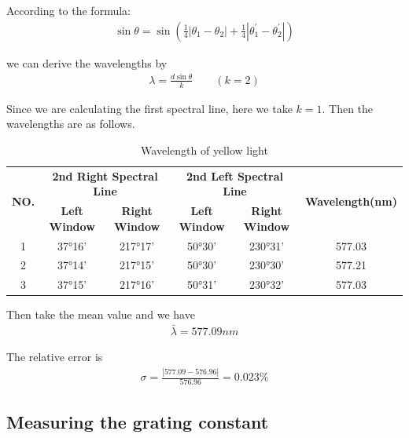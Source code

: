 \documentclass[UTF8]{article}
\begin{document}
   	 	According to the formula:
   	 	\begin{eqnarray}
   	 	\sin \theta = \sin (\frac{1}{4}\left | \theta_1 - \theta_2 \right | + \frac{1}{4}\left | \theta_1^{'} - \theta_2^{'} \right |)
   	 	\end{eqnarray}
   	 	
   	 	we can derive the wavelengths by
   	 	\begin{eqnarray}
   	 	\lambda = \frac{d\sin \theta}{k} \qquad (k = 2)
   	 	\end{eqnarray}
   	 	
   	 	Since we are calculating the first spectral line, here we take $k = 1$. Then the wavelengths are as follows.
   	 
   	 	\begin{table}[htbp]
   	 	  \centering
   	 	  \caption{Wavelength of yellow light}
   	 	  \begin{tabular}{cccccc}
   	 	    \toprule[2pt]
   	 	    \multirow{2}{*}{\textbf{NO.}} & \multicolumn{2}{c}{\textbf{2nd Right Spectral Line}} & \multicolumn{2}{c}{\textbf{2nd Left Spectral Line}} &  \multirow{2}{*}{\textbf{Wavelength(nm)}}\\
   	 	    \cline{2-5}
   	 	    & \textbf{Left Window} & \textbf{Right Window} &  \textbf{Left Window} & \textbf{Right Window}&\\
   	 	    \midrule
		    1 & 37°16' & 217°17' & 50°30' & 230°31' & 577.03\\
		    2 & 37°14' & 217°15' & 50°30' & 230°30' & 577.21\\
		    3 & 37°15' & 217°16' & 50°31' & 230°32' & 577.03\\
   	 	    \bottomrule[2pt]
   	 	  \end{tabular}
   	 	\end{table}
   	 	
   	 	Then take the mean value and we have 
   	 	\begin{eqnarray}
   	 	\bar{\lambda} = 577.09 nm
   	 	\end{eqnarray}
   	 	
   	 	The relative error is
   	 	\begin{eqnarray}
   	 	\sigma = \frac{| 577.09 - 576.96|}{576.96} = 0.023\%
   	 	\end{eqnarray}
   	 	
   	\subsection{Measuring the grating constant}
   	
\end{document}
